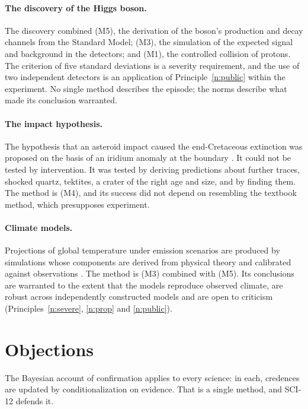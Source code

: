 \documentclass{situationist-preprint}
\begin{document}
\paragraph{The discovery of the Higgs boson.} The discovery combined (M5), the derivation of the boson's production and decay channels from the Standard Model; (M3), the simulation of the expected signal and background in the detectors; and (M1), the controlled collision of protons. The criterion of five standard deviations is a severity requirement, and the use of two independent detectors is an application of Principle~\ref{n:public} within the experiment. No single method describes the episode; the norms describe what made its conclusion warranted.

\paragraph{The impact hypothesis.} The hypothesis that an asteroid impact caused the end-Cretaceous extinction was proposed on the basis of an iridium anomaly at the boundary \citep{Alvarez1980}. It could not be tested by intervention. It was tested by deriving predictions about further traces, shocked quartz, tektites, a crater of the right age and size, and by finding them. The method is (M4), and its success did not depend on resembling the textbook method, which presupposes experiment.

\paragraph{Climate models.} Projections of global temperature under emission scenarios are produced by simulations whose components are derived from physical theory and calibrated against observations \citep{Winsberg2010}. The method is (M3) combined with (M5). Its conclusions are warranted to the extent that the models reproduce observed climate, are robust across independently constructed models and are open to criticism (Principles~\ref{n:severe}, \ref{n:prop} and \ref{n:public}).

\section{Objections}

\begin{objection}
The Bayesian account of confirmation applies to every science: in each, credences are updated by conditionalization on evidence. That is a single method, and SCI-12 defends it.
\end{objection}
\end{document}
